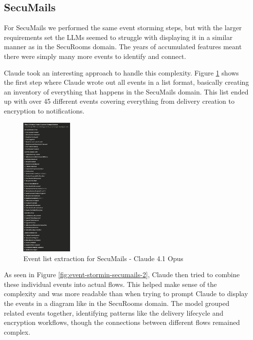   \subsection{SecuMails}

  For SecuMails we performed the same event storming steps, but with the larger requirements set the LLMs seemed to struggle with displaying it in a similar manner as in the SecuRooms domain. The years of accumulated features meant there were simply many more events to identify and connect.
  
  Claude took an interesting approach to handle this complexity. Figure \ref{fig:event-stormin-secumails-1} shows the first step where Claude wrote out all events in a list format, basically creating an inventory of everything that happens in the SecuMails domain. This list ended up with over 45 different events covering everything from delivery creation to encryption to notifications.
  
  \begin{figure}[htbp]
    \centering
    \includegraphics[height=7cm]{figures/secumails-event-storming-claude-1.png} 
    \caption{Event list extraction for SecuMails - Claude 4.1 Opus}
    \label{fig:event-stormin-secumails-1} 
  \end{figure}
  
  As seen in Figure \ref{fig:event-stormin-secumails-2}, Claude then tried to combine these individual events into actual flows. This helped make sense of the complexity and was more readable than when trying to prompt Claude to display the events in a diagram like in the SecuRooms domain. The model grouped related events together, identifying patterns like the delivery lifecycle and encryption workflows, though the connections between different flows remained complex.
  
